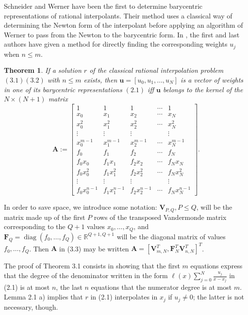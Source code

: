 \documentclass[11pt]{article}
\newtheorem{theorem}{Theorem}[section]
\theoremstyle{definition}
\begin{document}
Schneider and Werner \cite{schneider1986rational} have been the first to determine barycentric representations of rational interpolants. Their method uses a classical way of determining the Newton form of the interpolant before applying an algorithm of Werner to pass from the Newton to the barycentric form. In \cite{berrut1997matrices}, the first and last authors have given a method for directly finding the corresponding weights $u_{j}$ when $n \leq m$.

\begin{theorem}
    If a solution $r$ of the classical rational interpolation problem  $ (3.1)(3.2)  $ with $n \leq m$ exists, then $\mathbf{u}=\left[u_{0}, u_{1}, \ldots, u_{N}\right]$ is a vector of weights in one of
its barycentric representations  $ (2.1) $  iff $\mathbf{u}$ belongs to the kernel of the $N \times(N+1)$ matrix
\[
\mathbf{A}:=\left[\begin{array}{ccccc}
1 & 1 & 1 & \cdots & 1  \tag{3.3}\\
x_{0} & x_{1} & x_{2} & \cdots & x_{N} \\
x_{0}^{2} & x_{1}^{2} & x_{2}^{2} & \cdots & x_{N}^{2} \\
\vdots & \vdots & \vdots & & \vdots \\
x_{0}^{m-1} & x_{1}^{m-1} & x_{2}^{m-1} & \cdots & x_{N}^{m-1} \\
f_{0} & f_{1} & f_{2} & \cdots & f_{N} \\
f_{0} x_{0} & f_{1} x_{1} & f_{2} x_{2} & \cdots & f_{N} x_{N} \\
f_{0} x_{0}^{2} & f_{1} x_{1}^{2} & f_{2} x_{2}^{2} & \cdots & f_{N} x_{N}^{2} \\
\vdots & \vdots & \vdots & & \vdots \\
f_{0} x_{0}^{n-1} & f_{1} x_{1}^{n-1} & f_{2} x_{2}^{n-1} & \cdots & f_{N} x_{N}^{n-1}
\end{array}\right] .
\]
\end{theorem}

In order to save space, we introduce some notation: $\mathbf{V}_{P, Q}, P \leq Q$, will be the matrix made up of the first $P$ rows of the transposed Vandermonde matrix corresponding to the $Q+1$ values $x_{0}, \ldots, x_{Q}$, and $\mathbf{F}_{Q}=\operatorname{diag}\left(f_{0}, \ldots, f_{Q}\right) \in \mathbb{R}^{Q+1, Q+1}$ will be the diagonal matrix of values $f_{0}, \ldots, f_{Q}$. Then $\mathbf{A}$ in (3.3) may be written $\mathbf{A}=\left[\mathbf{V}_{m, N}^{T}, \mathbf{F}_{N}^{T} \mathbf{V}_{n, N}^{T}\right]^{T}$.

The proof of Theorem 3.1 consists in showing that the first $m$ equations express that the degree of the denominator written in the form $\ell(x) \sum_{j=0}^{N} \frac{u_{j}}{x-x_{j}}$ in (2.1) is at most $n$, the last $n$ equations that the numerator degree is at most $m$. Lemma 2.1 a) implies that $r$ in (2.1) interpolates in $x_{j}$ if $u_{j} \neq 0$; the latter is not necessary, though.
\end{document}
